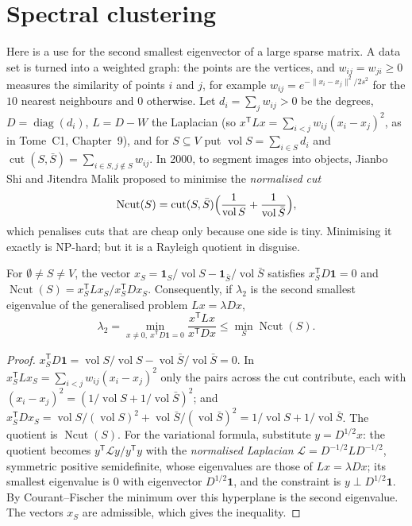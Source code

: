 \section{Spectral clustering}\label{sec:spectralclustering}

Here is a use for the second smallest eigenvector of a large sparse matrix. A data set is turned into a weighted graph: the points are the vertices,
and $w_{ij}=w_{ji}\ge0$ measures the similarity of points $i$ and $j$, for example $w_{ij}=e^{-\|x_i-x_j\|^2/2s^2}$ for the $10$ nearest neighbours and
$0$ otherwise. Let $d_i=\sum_jw_{ij}>0$ be the degrees, $D=\operatorname{diag}(d_i)$, $L=D-W$ the Laplacian (so $x^{\mathsf T}Lx=\sum_{i<j}w_{ij}(x_i-x_j)^2$, as in Tome~C1, Chapter~9),
and for $S\subseteq V$ put $\operatorname{vol}S=\sum_{i\in S}d_i$ and $\operatorname{cut}(S,\bar S)=\sum_{i\in S,j\notin S}w_{ij}$. In 2000, to segment images into objects,
Jianbo Shi and Jitendra Malik proposed to minimise the \emph{normalised cut}
\[
\operatorname{Ncut}(S)=\operatorname{cut}(S,\bar S)\Bigl(\frac1{\operatorname{vol}S}+\frac1{\operatorname{vol}\bar S}\Bigr),
\]
which penalises cuts that are cheap only because one side is tiny. Minimising it exactly is NP-hard; but it is a Rayleigh quotient in disguise.

\begin{theorem}\label{thm:ncut}
For $\emptyset\ne S\ne V$, the vector $x_S=\mathbf 1_S/\operatorname{vol}S-\mathbf 1_{\bar S}/\operatorname{vol}\bar S$ satisfies $x_S^{\mathsf T}D\mathbf1=0$ and
$\operatorname{Ncut}(S)=x_S^{\mathsf T}Lx_S/x_S^{\mathsf T}Dx_S$. Consequently, if $\lambda_2$ is the second smallest eigenvalue of the generalised problem $Lx=\lambda Dx$,
\[
\lambda_2=\min_{x\ne0,\ x^{\mathsf T}D\mathbf1=0}\frac{x^{\mathsf T}Lx}{x^{\mathsf T}Dx}\le\min_S\operatorname{Ncut}(S).
\]
\end{theorem}
\begin{proof}
$x_S^{\mathsf T}D\mathbf1=\operatorname{vol}S/\operatorname{vol}S-\operatorname{vol}\bar S/\operatorname{vol}\bar S=0$. In $x_S^{\mathsf T}Lx_S=\sum_{i<j}w_{ij}(x_i-x_j)^2$ only the pairs across the cut contribute, each
with $(x_i-x_j)^2=(1/\operatorname{vol}S+1/\operatorname{vol}\bar S)^2$; and $x_S^{\mathsf T}Dx_S=\operatorname{vol}S/(\operatorname{vol}S)^2+\operatorname{vol}\bar S/(\operatorname{vol}\bar S)^2=1/\operatorname{vol}S+1/\operatorname{vol}\bar S$. The quotient is
$\operatorname{Ncut}(S)$. For the variational formula, substitute $y=D^{1/2}x$: the quotient becomes $y^{\mathsf T}\mathcal Ly/y^{\mathsf T}y$ with the \emph{normalised Laplacian}
$\mathcal L=D^{-1/2}LD^{-1/2}$, symmetric positive semidefinite, whose eigenvalues are those of $Lx=\lambda Dx$; its smallest eigenvalue is $0$ with eigenvector $D^{1/2}\mathbf1$, and the constraint
is $y\perp D^{1/2}\mathbf1$. By Courant--Fischer the minimum over this hyperplane is the second eigenvalue. The vectors $x_S$ are admissible, which gives the inequality.
\end{proof}

